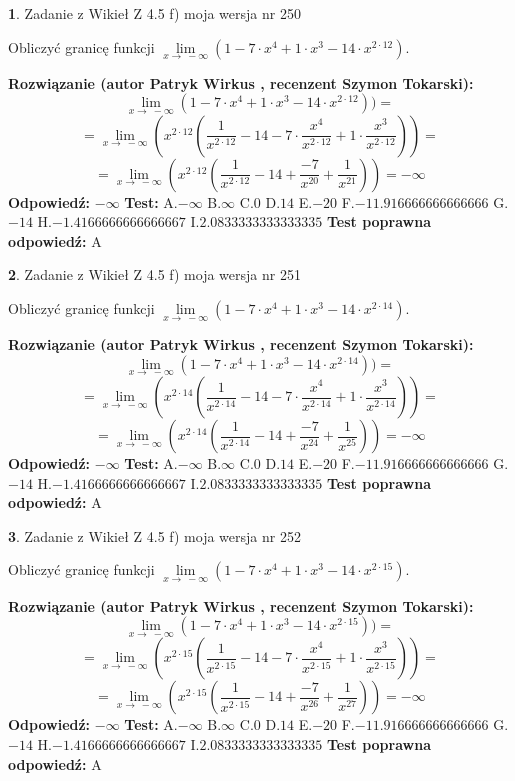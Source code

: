 \documentclass[12pt, a4paper]{article}
\theoremstyle{definition} %
\newtheorem{zad}{}
\newcommand{\zadStart}[1]{\begin{zad}#1\newline}
\newcommand{\zadStop}{\end{zad}}
\newcommand{\rozwStart}[2]{\noindent \textbf{Rozwiązanie (autor #1 , recenzent #2): }\newline}
\newcommand{\rozwStop}{\newline}
\newcommand{\odpStart}{\noindent \textbf{Odpowiedź:}\newline}
\newcommand{\odpStop}{\newline}
\newcommand{\testStart}{\noindent \textbf{Test:}\newline}
\newcommand{\testStop}{\newline}
\newcommand{\kluczStart}{\noindent \textbf{Test poprawna odpowiedź:}\newline}
\newcommand{\kluczStop}{\newline}
\begin{document}
\zadStart{Zadanie z Wikieł Z 4.5 f) moja wersja nr 250}


Obliczyć granicę funkcji  $\lim\limits_{x\to\ -\infty}(1 - 7 \cdot x^{4}+1 \cdot x^{3}- 14 \cdot x^{2\cdot12})$.
\zadStop
\rozwStart{Patryk Wirkus}{Szymon Tokarski}
$$\lim\limits_{x\to\ -\infty}(1 - 7 \cdot x^{4}+1 \cdot x^{3}- 14 \cdot x^{2\cdot12}))=$$
$$=\lim\limits_{x\to\ -\infty}(x^{2\cdot12}(\frac{1}{x^{2\cdot12}}-14 -7 \cdot \frac{x^{4}}{x^{2\cdot12}}+1 \cdot \frac{x^{3}}{x^{2\cdot12}}))=$$
$$=\lim\limits_{x\to\ -\infty}(x^{2\cdot12}(\frac{1}{x^{2\cdot12}}-14 + \frac{-7}{x^{20}}+ \frac{1}{x^{21}}))=-\infty$$
\rozwStop
\odpStart
$-\infty$
\odpStop
\testStart
A.$-\infty$ B.$\infty$ C.$0$ D.$14$ E.$-20$
F.$-11.916666666666666$ G.$-14$
H.$-1.4166666666666667$
I.$2.0833333333333335$
\testStop
\kluczStart
A
\kluczStop



\zadStart{Zadanie z Wikieł Z 4.5 f) moja wersja nr 251}


Obliczyć granicę funkcji  $\lim\limits_{x\to\ -\infty}(1 - 7 \cdot x^{4}+1 \cdot x^{3}- 14 \cdot x^{2\cdot14})$.
\zadStop
\rozwStart{Patryk Wirkus}{Szymon Tokarski}
$$\lim\limits_{x\to\ -\infty}(1 - 7 \cdot x^{4}+1 \cdot x^{3}- 14 \cdot x^{2\cdot14}))=$$
$$=\lim\limits_{x\to\ -\infty}(x^{2\cdot14}(\frac{1}{x^{2\cdot14}}-14 -7 \cdot \frac{x^{4}}{x^{2\cdot14}}+1 \cdot \frac{x^{3}}{x^{2\cdot14}}))=$$
$$=\lim\limits_{x\to\ -\infty}(x^{2\cdot14}(\frac{1}{x^{2\cdot14}}-14 + \frac{-7}{x^{24}}+ \frac{1}{x^{25}}))=-\infty$$
\rozwStop
\odpStart
$-\infty$
\odpStop
\testStart
A.$-\infty$ B.$\infty$ C.$0$ D.$14$ E.$-20$
F.$-11.916666666666666$ G.$-14$
H.$-1.4166666666666667$
I.$2.0833333333333335$
\testStop
\kluczStart
A
\kluczStop



\zadStart{Zadanie z Wikieł Z 4.5 f) moja wersja nr 252}


Obliczyć granicę funkcji  $\lim\limits_{x\to\ -\infty}(1 - 7 \cdot x^{4}+1 \cdot x^{3}- 14 \cdot x^{2\cdot15})$.
\zadStop
\rozwStart{Patryk Wirkus}{Szymon Tokarski}
$$\lim\limits_{x\to\ -\infty}(1 - 7 \cdot x^{4}+1 \cdot x^{3}- 14 \cdot x^{2\cdot15}))=$$
$$=\lim\limits_{x\to\ -\infty}(x^{2\cdot15}(\frac{1}{x^{2\cdot15}}-14 -7 \cdot \frac{x^{4}}{x^{2\cdot15}}+1 \cdot \frac{x^{3}}{x^{2\cdot15}}))=$$
$$=\lim\limits_{x\to\ -\infty}(x^{2\cdot15}(\frac{1}{x^{2\cdot15}}-14 + \frac{-7}{x^{26}}+ \frac{1}{x^{27}}))=-\infty$$
\rozwStop
\odpStart
$-\infty$
\odpStop
\testStart
A.$-\infty$ B.$\infty$ C.$0$ D.$14$ E.$-20$
F.$-11.916666666666666$ G.$-14$
H.$-1.4166666666666667$
I.$2.0833333333333335$
\testStop
\kluczStart
A
\kluczStop
\end{document}
